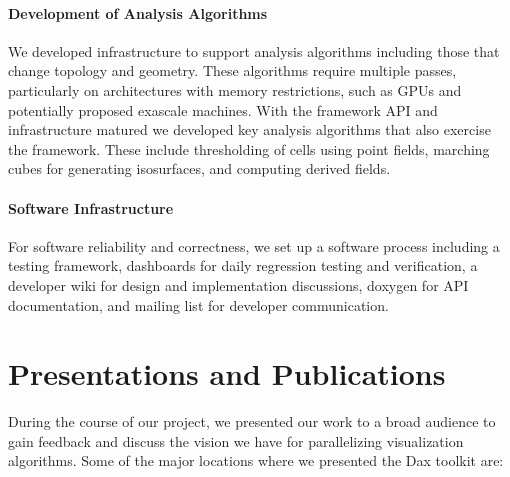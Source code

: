 \paragraph*{Development of Analysis Algorithms}

We developed infrastructure to support analysis algorithms including those
that change topology and geometry. These algorithms require multiple
passes, particularly on architectures with memory restrictions, such as
GPUs and potentially proposed exascale machines. With the framework API and
infrastructure matured we developed key analysis algorithms that also
exercise the framework. These include thresholding of cells using point
fields, marching cubes for generating isosurfaces, and computing derived
fields.

\paragraph*{Software Infrastructure}

For software reliability and correctness, we set up a software process
including a testing framework, dashboards for daily regression testing and
verification, a developer wiki for design and implementation discussions,
doxygen for API documentation, and mailing list for developer
communication.


\section*{Presentations and Publications}

During the course of our project, we presented our work to a broad audience
to gain feedback and discuss the vision we have for parallelizing
visualization algorithms. Some of the major locations where we presented
the Dax toolkit are:

